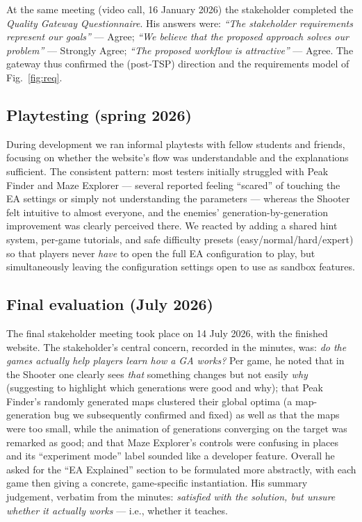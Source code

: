 \documentclass[conference]{IEEEtran}
\begin{document}
At the same meeting (video call, 16 January 2026) the stakeholder completed the \emph{Quality Gateway Questionnaire}. His answers were: \emph{``The stakeholder requirements represent our goals''} --- Agree; \emph{``We believe that the proposed approach solves our problem''} --- Strongly Agree; \emph{``The proposed workflow is attractive''} --- Agree. The gateway thus confirmed the (post-TSP) direction and the requirements model of Fig.~\ref{fig:req}.

\subsection{Playtesting (spring 2026)}
During development we ran informal playtests with fellow students and friends, focusing on whether the website's flow was understandable and the explanations sufficient. The consistent pattern: most testers initially struggled with Peak Finder and Maze Explorer --- several reported feeling ``scared'' of touching the EA settings or simply not understanding the parameters --- whereas the Shooter felt intuitive to almost everyone, and the enemies' generation-by-generation improvement was clearly perceived there. We reacted by adding a shared hint system, per-game tutorials, and safe difficulty presets (easy/normal/hard/expert) so that players never \emph{have} to open the full EA configuration to play, but simultaneously leaving the configuration settings open to use as sandbox features.

\subsection{Final evaluation (July 2026)}
The final stakeholder meeting took place on 14 July 2026, with the finished website. The stakeholder's central concern, recorded in the minutes, was: \emph{do the games actually help players learn how a GA works?} Per game, he noted that in the Shooter one clearly sees \emph{that} something changes but not easily \emph{why} (suggesting to highlight which generations were good and why); that Peak Finder's randomly generated maps clustered their global optima (a map-generation bug we subsequently confirmed and fixed) as well as that the maps were too small, while the animation of generations converging on the target was remarked as good; and that Maze Explorer's controls were confusing in places and its ``experiment mode'' label sounded like a developer feature. Overall he asked for the ``EA Explained'' section to be formulated more abstractly, with each game then giving a concrete, game-specific instantiation. His summary judgement, verbatim from the minutes: \emph{satisfied with the solution, but unsure whether it actually works} --- i.e., whether it teaches.
\end{document}
